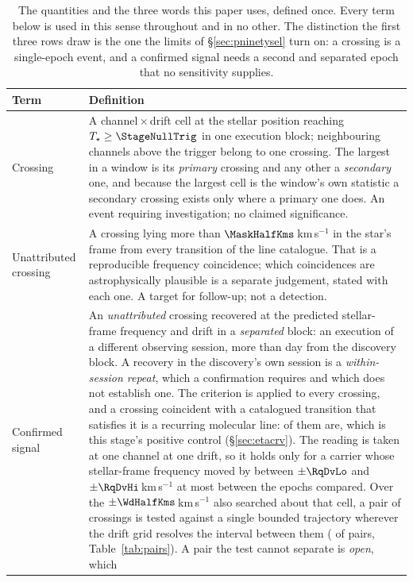 \begin{table}
\centering
\caption{The quantities and the three words this paper uses, defined once.
Every term below is used in this sense throughout and in no other. The
distinction the first three rows draw is the one the limits of
\S\ref{sec:pninetysel} turn on: a crossing is a single-epoch event, and a
confirmed signal needs a second and separated epoch that no sensitivity
supplies.}
\label{tab:quantities}
\small
\begin{tabular}{@{}p{}p{}@{}}
\hline
Term & Definition \\
\hline
Crossing &
A channel\,$\times$\,drift cell at the stellar position reaching
$T_\star\geq\StageNullTrig$ in one execution block; neighbouring channels
above the trigger belong to one crossing. The largest in a window is its
\emph{primary} crossing and any other a \emph{secondary} one, and because the
largest cell is the window's own statistic a secondary crossing exists only
where a primary one does. An event requiring investigation; no claimed
significance. \\
Unattributed crossing &
A crossing lying more than $\MaskHalfKms$\,km\,s$^{-1}$ in the star's frame
from every transition of the line catalogue. That is a reproducible frequency
coincidence; which coincidences are astrophysically plausible is a separate
judgement, stated with each one. A target for follow-up; not a detection. \\
Confirmed signal &
An \emph{unattributed} crossing recovered at the predicted stellar-frame
frequency and drift in a \emph{separated} block: an execution of a different
observing session, more than \EpSep{} day from the discovery block. A
recovery in the discovery's own session is a \emph{within-session repeat},
which a confirmation requires and which does not establish one. The criterion is
applied to every crossing, and a crossing coincident with a catalogued
transition that satisfies it is a recurring molecular line:
\MkAttrRecur{} of them are, which is this stage's positive control
(\S\ref{sec:etacrv}). The reading is taken at one channel at one drift, so it holds only for a
carrier whose stellar-frame frequency moved by between $\pm\RqDvLo$ and
$\pm\RqDvHi$\,km\,s$^{-1}$ at most between the epochs compared. Over the
$\pm\WdHalfKms$\,km\,s$^{-1}$ also searched about that cell, a pair of
crossings is tested against a single bounded trajectory wherever the drift
grid resolves the interval between them (\TjNPower{} of \TjNPair{} pairs,
Table~\ref{tab:pairs}). A pair the test cannot separate is \emph{open}, which

\end{tabular}
\end{table}
